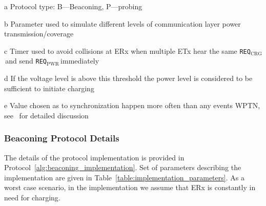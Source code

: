 \documentclass[11pt,draftclsnofoot,journal,onecolumn]{IEEEtran}
\newcommand{\textsubscript}[1]{$_{\text{#1}}$}
\newcommand{\chargingRequest}{\texttt{REQ\textsubscript{CRG}}\,}
\newcommand{\powerProbeRequest}{\texttt{REQ\textsubscript{PWR}}\,}
\begin{document}
\begin{table*}
\begin{threeparttable}
\begin{center}
\begin{tablenotes}
\item[a] Protocol type: B---Beaconing, P---probing
\item[b] Parameter used to simulate different levels of communication layer power transmission/coverage
\item[c] Timer used to avoid collisions at ERx when multiple ETx hear the same \chargingRequest and send \powerProbeRequest immediately
\item[d] If the voltage level is above this threshold the power level is considered to be sufficient to initiate charging
\item[e] Value chosen as to synchronization happen more often than any events WPTN, see~\cite[Sec. 5.2]{golinski_msc_2015} for detailed discussion
\end{tablenotes}
\end{center}
\label{table:implementation_parameters}
\end{threeparttable}
\end{table*}

\subsubsection{Beaconing Protocol Details}
\label{subsubsec:beaconing_based_protocol}

The details of the protocol implementation is provided in Protocol~\ref{alg:beaconing_implementation}. Set of parameters describing the implementation are given in Table~\ref{table:implementation_parameters}. As a worst case scenario, in the implementation we assume that ERx is constantly in need for charging.
\end{document}
